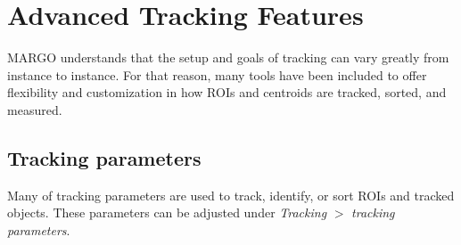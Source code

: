 \documentclass[11pt]{article}
\begin{document}
\newpage
\section{Advanced Tracking Features}

MARGO understands that the setup and goals of tracking can vary greatly from instance to instance. For that reason, many tools have been included to offer flexibility and customization in how ROIs and centroids are tracked, sorted, and measured.

\subsection{Tracking parameters}

Many of tracking parameters are used to track, identify, or sort ROIs and tracked objects. These parameters can be adjusted under \textit{Tracking} $>$ \textit{tracking parameters}.
\end{document}
